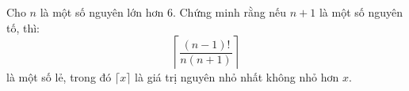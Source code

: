\ifshowproblem
\begin{problem}\label{example:THA-2015-MO-P5}
    Cho \( n \) là một số nguyên lớn hơn \( 6 \).  
    Chứng minh rằng nếu \( n+1 \) là một số nguyên tố, thì:
    \[
        \left\lceil \frac{(n-1)!}{n(n+1)} \right\rceil
    \]
    là một số lẻ, trong đó \( \lceil x \rceil \) là giá trị nguyên nhỏ nhất không nhỏ hơn \( x \).
\end{problem}
\fi

\footnotemark
{}
\fi